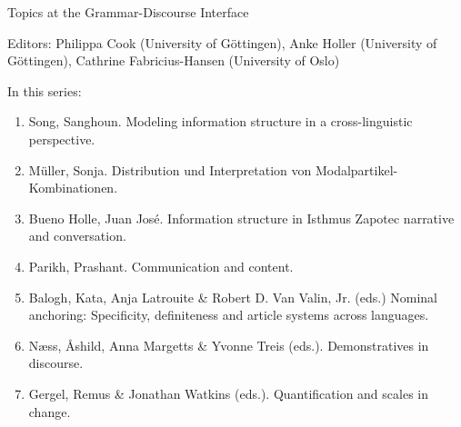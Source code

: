 {\large  Topics at the Grammar-Discourse Interface}

\bigskip

Editors: Philippa Cook (University of Göttingen),
Anke Holler (University of Göttingen),
Cathrine Fabricius-Hansen (University of Oslo)

\bigskip

In this series:

\begin{enumerate}
        \item Song, Sanghoun. Modeling information structure in a cross-linguistic perspective.
        \item Müller, Sonja. Distribution und Interpretation von Modalpartikel-Kombinationen.
        \item Bueno Holle, Juan José. Information structure in Isthmus Zapotec narrative and conversation.
        \item Parikh, Prashant. Communication and content.
        \item Balogh, Kata, Anja Latrouite \& Robert D. Van Valin‚ Jr. (eds.) Nominal anchoring: Specificity, definiteness and article systems across languages.
        \item Næss, Åshild, Anna Margetts \& Yvonne Treis (eds.). Demonstratives in discourse.
        \item Gergel, Remus \& Jonathan Watkins (eds.). Quantification and scales in change.
\end{enumerate}

